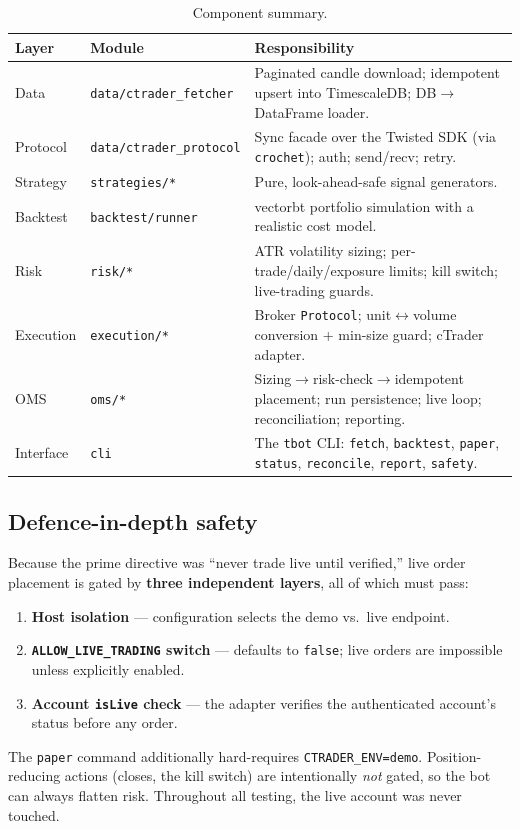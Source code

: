 \documentclass[11pt,a4paper]{article}
\newcommand{\tbot}[1]{\texttt{#1}}
\begin{document}
\begin{table}[ht]\centering
\caption{Component summary.}
\begin{tabular}{@{}llp{7.2cm}@{}}
\toprule
\textbf{Layer} & \textbf{Module} & \textbf{Responsibility} \\
\midrule
Data & \tbot{data/ctrader\_fetcher} & Paginated candle download; idempotent upsert into TimescaleDB; DB$\to$DataFrame loader. \\
Protocol & \tbot{data/ctrader\_protocol} & Sync facade over the Twisted SDK (via \tbot{crochet}); auth; send/recv; retry. \\
Strategy & \tbot{strategies/*} & Pure, look-ahead-safe signal generators. \\
Backtest & \tbot{backtest/runner} & vectorbt portfolio simulation with a realistic cost model. \\
Risk & \tbot{risk/*} & ATR volatility sizing; per-trade/daily/exposure limits; kill switch; live-trading guards. \\
Execution & \tbot{execution/*} & Broker \tbot{Protocol}; unit$\leftrightarrow$volume conversion + min-size guard; cTrader adapter. \\
OMS & \tbot{oms/*} & Sizing$\to$risk-check$\to$idempotent placement; run persistence; live loop; reconciliation; reporting. \\
Interface & \tbot{cli} & The \tbot{tbot} CLI: \tbot{fetch}, \tbot{backtest}, \tbot{paper}, \tbot{status}, \tbot{reconcile}, \tbot{report}, \tbot{safety}. \\
\bottomrule
\end{tabular}
\end{table}

\subsection{Defence-in-depth safety}\label{sec:safety}
Because the prime directive was ``never trade live until verified,'' live order placement is gated by \textbf{three independent layers}, all of which must pass:
\begin{enumerate}[leftmargin=1.6em]
  \item \textbf{Host isolation} --- configuration selects the demo vs.\ live endpoint.
  \item \textbf{\tbot{ALLOW\_LIVE\_TRADING} switch} --- defaults to \tbot{false}; live orders are impossible unless explicitly enabled.
  \item \textbf{Account \tbot{isLive} check} --- the adapter verifies the authenticated account's status before any order.
\end{enumerate}
The \tbot{paper} command additionally hard-requires \tbot{CTRADER\_ENV=demo}. Position-reducing actions (closes, the kill switch) are intentionally \emph{not} gated, so the bot can always flatten risk. Throughout all testing, the live account was never touched.
\end{document}
